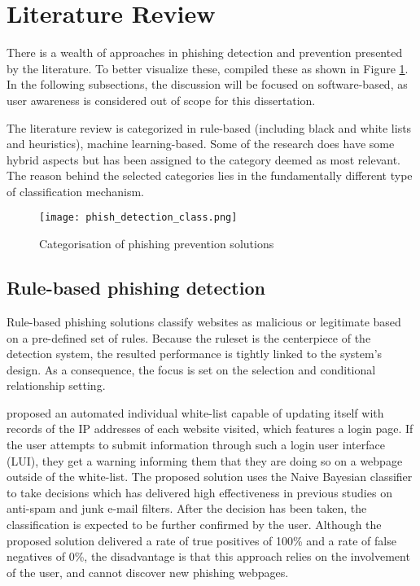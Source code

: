 
\section{Literature Review}
There is a wealth of approaches in phishing detection and prevention presented
by the literature. To better visualize these, \cite{ML_BASED_DETECTION_FROM_URL}
compiled these as shown in Figure \ref{fig:PHISHING_SOLUTION_CATEGS}. In the
following subsections, the discussion will be focused on software-based, as user
awareness is considered out of scope for this dissertation.

The literature review is categorized in rule-based (including black and white
lists and heuristics), machine learning-based. Some of the research does have
some hybrid aspects but has been assigned to the category deemed as most
relevant. The reason behind the selected categories lies in the fundamentally
different type of classification mechanism.

\begin{figure}[b]
	\centering
	\texttt{[image: phish\_detection\_class.png]}
	\caption{
		Categorisation of phishing prevention solutions
		\citep{ML_BASED_DETECTION_FROM_URL}}
	\label{fig:PHISHING_SOLUTION_CATEGS}
\end{figure}

\subsection{Rule-based phishing detection}
\label{RULEBASED}

Rule-based phishing solutions classify websites as malicious or legitimate based
on a pre-defined set of rules. Because the ruleset is the centerpiece of the
detection system, the resulted performance is tightly linked to the system's
design. As a consequence, the focus is set on the selection and conditional
relationship setting.

\cite{ANTIPHISHING_AUTOMATED_WHITELIST} proposed an automated individual
white-list capable of updating itself with records of the IP addresses of each
website visited, which features a login page. If the user attempts to submit
information through such a login user interface (LUI), they get a warning
informing them that they are doing so on a webpage outside of the white-list.
The proposed solution uses the Naive Bayesian classifier to take decisions which
has delivered high effectiveness in previous studies on anti-spam
\citep{BAESYAN_KEYWORD_COMPARISON} and junk e-mail
\citep{BAESYAN_JUNK_FILTERING} filters. After the decision has been taken, the
classification is expected to be further confirmed by the user. Although the
proposed solution delivered a rate of true positives of 100\% and a rate of
false negatives of 0\%, the disadvantage is that this approach relies on the
involvement of the user, and cannot discover new phishing webpages.


